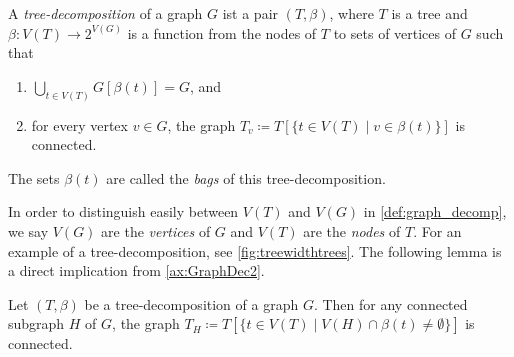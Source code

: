 \documentclass{lmcs}
\theoremstyle{plain}\newtheorem{claim}[thm]{Claim}   %
\newcommand{\Fdec}{\ensuremath{(T,\beta)}}
\begin{document}
\begin{defi}
	\label{def:graph_decomp}
	A \emph{tree-decomposition} of a graph $G$ ist a pair $(T,\beta)$, where $T$ is a tree and $\beta\colon V(T)\rightarrow 2^{V(G)}$ is a function from the nodes of $T$ to sets of vertices of $G$ such that
	\begin{enumerate}[label=(TD.\arabic*), labelindent=0pt,itemindent=*,leftmargin=*]
		\item $\bigcup_{t\in V(T)} G[\beta(t)] = G$, and \label{ax:GraphDec1}
		\item for every vertex $v \in G$, the graph $T_v\coloneqq T[\{t\in V(T)\mid v\in \beta(t)\}]$ is connected. \label{ax:GraphDec2}
	\end{enumerate}
	The sets $\beta(t)$ are called the \emph{bags} of this tree-decomposition.
\end{defi}

In order to distinguish easily between $V(T)$ and $V(G)$ in \autoref{def:graph_decomp}, we say $V(G)$ are the \emph{vertices} of $G$ and $V(T)$ are the \emph{nodes} of $T$.
For an example of a tree-decomposition, see \autoref{fig:treewidthtrees}.
The following lemma is a direct implication from \ref{ax:GraphDec2}.

\begin{lem}
	\label{lem:GraphDecConnSubgraph}
	Let $\Fdec$ be a tree-decomposition of a graph $G$.
	Then for any connected subgraph $H$ of $G$, the graph $T_H\coloneqq T[\{t\in V(T)\mid V(H)\cap \beta(t)\neq\emptyset\}]$ is connected. 
\end{lem}
\end{document}
